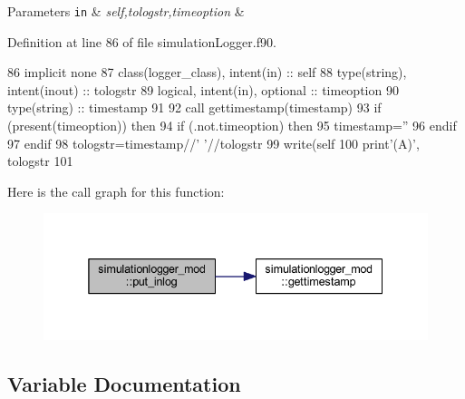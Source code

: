 \begin{DoxyParams}[1]{Parameters}
\mbox{\tt in}  & {\em self,tologstr,timeoption} & \\
\hline
\end{DoxyParams}


Definition at line 86 of file simulation\+Logger.\+f90.


\begin{DoxyCode}
86     \textcolor{keywordtype}{implicit none}
87     \textcolor{keywordtype}{class}(logger\_class), \textcolor{keywordtype}{intent(in)} :: self
88     \textcolor{keywordtype}{type}(string), \textcolor{keywordtype}{intent(inout)} :: tologstr
89     \textcolor{keywordtype}{logical}, \textcolor{keywordtype}{intent(in)}, \textcolor{keywordtype}{optional} :: timeoption
90     \textcolor{keywordtype}{type}(string) :: timestamp
91 
92     \textcolor{keyword}{call }gettimestamp(timestamp)
93     \textcolor{keywordflow}{if} (\textcolor{keyword}{present}(timeoption)) \textcolor{keywordflow}{then}
94         \textcolor{keywordflow}{if} (.not.timeoption) \textcolor{keywordflow}{then}
95             timestamp=\textcolor{stringliteral}{''}
96 \textcolor{keywordflow}{        endif}
97 \textcolor{keywordflow}{    endif}
98     tologstr=timestamp//\textcolor{stringliteral}{' '}//tologstr
99     \textcolor{keyword}{write}(self%
100     print\textcolor{stringliteral}{'(A)'}, tologstr%
101 
\end{DoxyCode}
Here is the call graph for this function\+:\nopagebreak
\begin{figure}[H]
\begin{center}
\leavevmode
\includegraphics[width=338pt]{namespacesimulationlogger__mod_a3bf437b875b454ef326a3bc660542539_cgraph}
\end{center}
\end{figure}


\subsection{Variable Documentation}
\mbox{\label{namespacesimulationlogger__mod_a0d667ffec2a1129f89f4bd8fe6dc8a43}} 
